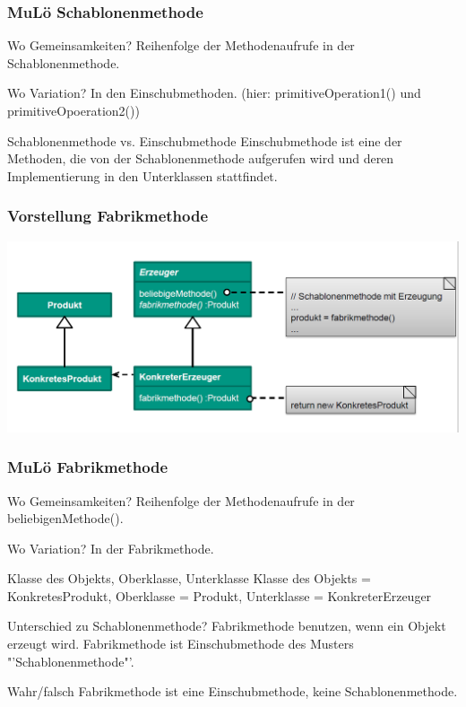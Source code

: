 \documentclass[18pt]{beamer}
\begin{document}
	\begin{frame}
		\frametitle{MuLö Schablonenmethode}
		\begin{block}{Wo Gemeinsamkeiten?}
			Reihenfolge der Methodenaufrufe in der Schablonenmethode.
		\end{block}
		\begin{block}{Wo Variation?}
			In den Einschubmethoden. (hier: primitiveOperation1() und primitiveOpoeration2())
		\end{block}
		\begin{block}{Schablonenmethode vs. Einschubmethode}
			Einschubmethode ist eine der Methoden, die von der Schablonenmethode aufgerufen wird und deren Implementierung in den Unterklassen stattfindet.
		\end{block}
	\end{frame}

	\begin{frame}
		\frametitle{Vorstellung Fabrikmethode}
		\includegraphics[scale=0.4]{./pics/tut4/fab.png}
	\end{frame}

	\begin{frame}
		\frametitle{MuLö Fabrikmethode}
		\begin{block}{Wo Gemeinsamkeiten?}
			Reihenfolge der Methodenaufrufe in der beliebigenMethode().
		\end{block}
		\begin{block}{Wo Variation?}
			In der Fabrikmethode.
		\end{block}
		\begin{block}{Klasse des Objekts, Oberklasse, Unterklasse}
			Klasse des Objekts = KonkretesProdukt, Oberklasse = Produkt, Unterklasse = KonkreterErzeuger
		\end{block}
		\begin{block}{Unterschied zu Schablonenmethode?}
			Fabrikmethode benutzen, wenn ein Objekt erzeugt wird. Fabrikmethode ist Einschubmethode des Musters "'Schablonenmethode"'.
		\end{block}
		\begin{block}{Wahr/falsch}
			Fabrikmethode ist eine Einschubmethode, keine Schablonenmethode.
		\end{block}
	\end{frame}
\end{document}
